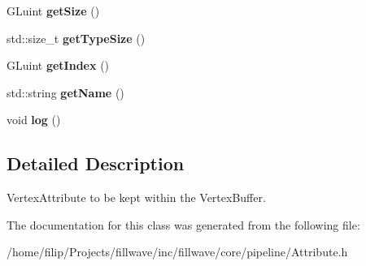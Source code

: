 \begin{DoxyCompactItemize}
\item 
G\+Luint {\bfseries get\+Size} ()\hypertarget{classflw_1_1flc_1_1Attribute_ab93f96f0ac409db8218733548f826631}{}\label{classflw_1_1flc_1_1Attribute_ab93f96f0ac409db8218733548f826631}

\item 
std\+::size\+\_\+t {\bfseries get\+Type\+Size} ()\hypertarget{classflw_1_1flc_1_1Attribute_af90ea27f1a20d41141e47f852e5ee74f}{}\label{classflw_1_1flc_1_1Attribute_af90ea27f1a20d41141e47f852e5ee74f}

\item 
G\+Luint {\bfseries get\+Index} ()\hypertarget{classflw_1_1flc_1_1Attribute_a39b0a8b4c8a9217e668da11cea14f495}{}\label{classflw_1_1flc_1_1Attribute_a39b0a8b4c8a9217e668da11cea14f495}

\item 
std\+::string {\bfseries get\+Name} ()\hypertarget{classflw_1_1flc_1_1Attribute_a13702b43cb77100a5ca11f1718097a7e}{}\label{classflw_1_1flc_1_1Attribute_a13702b43cb77100a5ca11f1718097a7e}

\item 
void {\bfseries log} ()\hypertarget{classflw_1_1flc_1_1Attribute_a19bfd4b693aae71bfe6d336e16bf63af}{}\label{classflw_1_1flc_1_1Attribute_a19bfd4b693aae71bfe6d336e16bf63af}

\end{DoxyCompactItemize}


\subsection{Detailed Description}
Vertex\+Attribute to be kept within the Vertex\+Buffer. 

The documentation for this class was generated from the following file\+:\begin{DoxyCompactItemize}
\item 
/home/filip/\+Projects/fillwave/inc/fillwave/core/pipeline/Attribute.\+h\end{DoxyCompactItemize}
